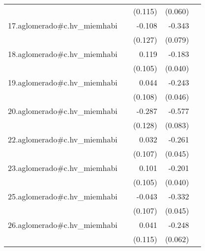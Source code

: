 {\begin{longtable}{l*{4}{D{.}{.}{-1}}}
            &                     &     (0.115)         &     (0.060)         &                     \\
\addlinespace
17.aglomerado#c.hv\_miemhabi&                     &      -0.108         &      -0.343\sym{***}&                     \\
            &                     &     (0.127)         &     (0.079)         &                     \\
\addlinespace
18.aglomerado#c.hv\_miemhabi&                     &       0.119         &      -0.183\sym{***}&                     \\
            &                     &     (0.105)         &     (0.040)         &                     \\
\addlinespace
19.aglomerado#c.hv\_miemhabi&                     &       0.044         &      -0.243\sym{***}&                     \\
            &                     &     (0.108)         &     (0.046)         &                     \\
\addlinespace
20.aglomerado#c.hv\_miemhabi&                     &      -0.287\sym{*}  &      -0.577\sym{***}&                     \\
            &                     &     (0.128)         &     (0.083)         &                     \\
\addlinespace
22.aglomerado#c.hv\_miemhabi&                     &       0.032         &      -0.261\sym{***}&                     \\
            &                     &     (0.107)         &     (0.045)         &                     \\
\addlinespace
23.aglomerado#c.hv\_miemhabi&                     &       0.101         &      -0.201\sym{***}&                     \\
            &                     &     (0.105)         &     (0.040)         &                     \\
\addlinespace
25.aglomerado#c.hv\_miemhabi&                     &      -0.043         &      -0.332\sym{***}&                     \\
            &                     &     (0.107)         &     (0.045)         &                     \\
\addlinespace
26.aglomerado#c.hv\_miemhabi&                     &       0.041         &      -0.248\sym{***}&                     \\
            &                     &     (0.115)         &     (0.062)         &                     \\

\end{longtable}}
